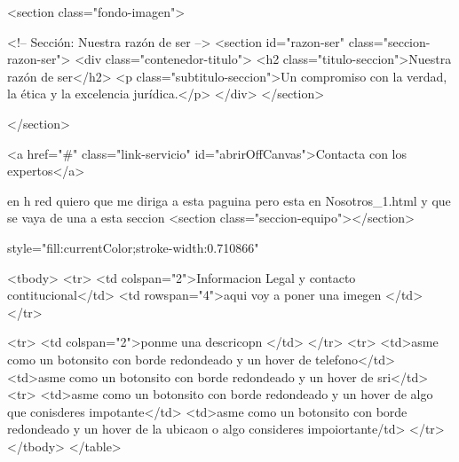 <section class="fondo-imagen">

<!-- Sección: Nuestra razón de ser -->
    <section id="razon-ser" class="seccion-razon-ser">
    <div class="contenedor-titulo">
        <h2 class="titulo-seccion">Nuestra razón de ser</h2>
        <p class="subtitulo-seccion">Un compromiso con la verdad, la ética y la excelencia jurídica.</p>
    </div>
    </section>


</section>


  <a href="#" class="link-servicio" id="abrirOffCanvas">Contacta con los expertos</a>

  en h red quiero que me diriga a esta paguina 
pero esta en Nosotros_1.html   y que se vaya de una a esta seccion 
 <section class="seccion-equipo"></section>


  style="fill:currentColor;stroke-width:0.710866"


    <tbody>
       <tr>
      <td colspan="2">Informacion Legal y contacto contitucional</td> <td rowspan="4">aqui voy a poner una imegen </td>
    </tr>
  
    <tr>
      <td colspan="2">ponme una descricopn </td>      
    </tr>
    <tr>
      <td>asme como un botonsito con borde redondeado y un hover  de telefono</td>     <td>asme como un botonsito con borde redondeado y un hover  de sri</td>    
     <tr>
      <td>asme como un botonsito con borde redondeado y un hover  de algo que conisderes impotante</td>     <td>asme como un botonsito con borde redondeado y un hover  de  la ubicaon o algo consideres impoiortante/td>         
    </tr>
  </tbody>
</table>